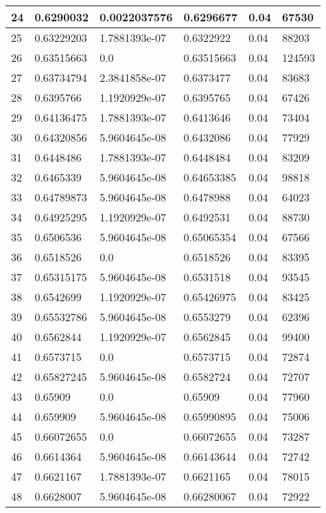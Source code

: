 \begin{longtable}{|l|l|l|l|l|l|}
24 & 0.6290032 & 0.0022037576 & 0.6296677 & 0.04 & 67530 \\ \hline 
25 & 0.63229203 & 1.7881393e-07 & 0.6322922 & 0.04 & 88203 \\ \hline 
26 & 0.63515663 & 0.0 & 0.63515663 & 0.04 & 124593 \\ \hline 
27 & 0.63734794 & 2.3841858e-07 & 0.6373477 & 0.04 & 83683 \\ \hline 
28 & 0.6395766 & 1.1920929e-07 & 0.6395765 & 0.04 & 67426 \\ \hline 
29 & 0.64136475 & 1.7881393e-07 & 0.6413646 & 0.04 & 73404 \\ \hline 
30 & 0.64320856 & 5.9604645e-08 & 0.6432086 & 0.04 & 77929 \\ \hline 
31 & 0.6448486 & 1.7881393e-07 & 0.6448484 & 0.04 & 83209 \\ \hline 
32 & 0.6465339 & 5.9604645e-08 & 0.64653385 & 0.04 & 98818 \\ \hline 
33 & 0.64789873 & 5.9604645e-08 & 0.6478988 & 0.04 & 64023 \\ \hline 
34 & 0.64925295 & 1.1920929e-07 & 0.6492531 & 0.04 & 88730 \\ \hline 
35 & 0.6506536 & 5.9604645e-08 & 0.65065354 & 0.04 & 67566 \\ \hline 
36 & 0.6518526 & 0.0 & 0.6518526 & 0.04 & 83395 \\ \hline 
37 & 0.65315175 & 5.9604645e-08 & 0.6531518 & 0.04 & 93545 \\ \hline 
38 & 0.6542699 & 1.1920929e-07 & 0.65426975 & 0.04 & 83425 \\ \hline 
39 & 0.65532786 & 5.9604645e-08 & 0.6553279 & 0.04 & 62396 \\ \hline 
40 & 0.6562844 & 1.1920929e-07 & 0.6562845 & 0.04 & 99400 \\ \hline 
41 & 0.6573715 & 0.0 & 0.6573715 & 0.04 & 72874 \\ \hline 
42 & 0.65827245 & 5.9604645e-08 & 0.6582724 & 0.04 & 72707 \\ \hline 
43 & 0.65909 & 0.0 & 0.65909 & 0.04 & 77960 \\ \hline 
44 & 0.659909 & 5.9604645e-08 & 0.65990895 & 0.04 & 75006 \\ \hline 
45 & 0.66072655 & 0.0 & 0.66072655 & 0.04 & 73287 \\ \hline 
46 & 0.6614364 & 5.9604645e-08 & 0.66143644 & 0.04 & 72742 \\ \hline 
47 & 0.6621167 & 1.7881393e-07 & 0.6621165 & 0.04 & 78015 \\ \hline 
48 & 0.6628007 & 5.9604645e-08 & 0.66280067 & 0.04 & 72922 \\ \hline 

\end{longtable}
